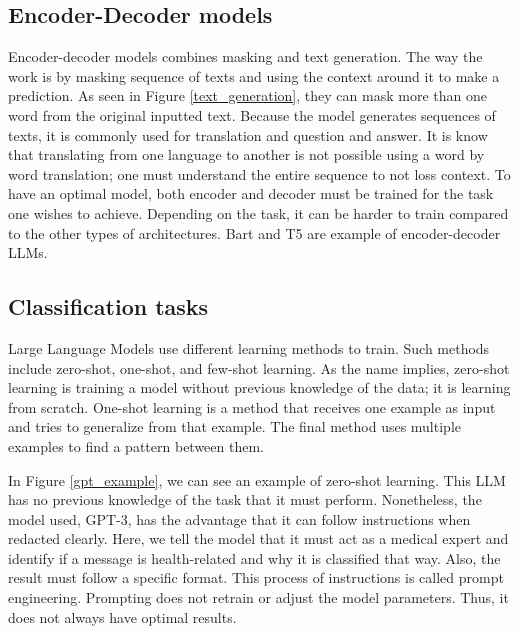 \subsection{Encoder-Decoder models}
Encoder-decoder models combines masking and text generation. The way the work is by masking sequence of texts and using the context around it to make a prediction. As seen
in Figure \ref{text_generation}, they can mask more than one word from the original inputted text. Because the model generates sequences of texts, it is commonly used for translation
and question and answer. It is know that translating from one language to another is not possible using a word by word translation; one must understand the entire sequence to not loss context.
To have an optimal model, both encoder and decoder must be trained for the task one wishes to achieve. Depending on the task, it can be harder to train compared to the other types of architectures.
Bart \cite{lewis2019bartdenoisingsequencetosequencepretraining} and T5 \cite{chung2022scalinginstructionfinetunedlanguagemodels} are example of encoder-decoder LLMs.


\subsection{Classification tasks}
Large Language Models use different learning methods to train. Such methods include zero-shot, one-shot, and few-shot learning. As the name implies, zero-shot learning is training a model without
previous knowledge of the data; it is learning from scratch. One-shot learning is a method that receives one example as input and tries to generalize from that example. The final method uses
multiple examples to find a pattern between them. 

In Figure \ref{gpt_example}, we can see an example of zero-shot learning. This LLM has no previous knowledge of the task that it must perform. Nonetheless, the model used, GPT-3, has the 
advantage that it can follow instructions when redacted clearly. Here, we tell the model that it must act as a medical expert and identify if a message is health-related and why it is classified that way. 
Also, the result must follow a specific format. This process of instructions is called prompt engineering. Prompting does not retrain or adjust the model parameters. Thus, it does not always have optimal results.  
 
